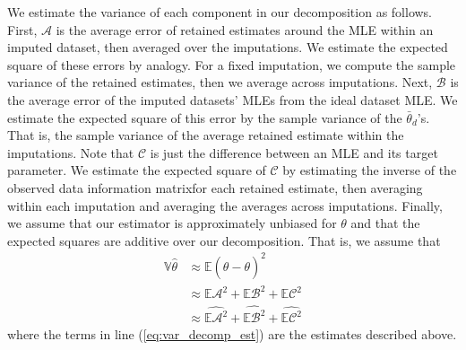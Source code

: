 \documentclass[11pt, oneside]{article}   	%
\newcommand{\bV}{\mathbb{V}}
\newcommand{\bE}{\mathbb{E}}
\begin{document}
We estimate the variance of each component in our decomposition as follows. First, $\mathcal{A}$ is the average error of retained estimates around the MLE within an imputed dataset, then averaged over the imputations. We estimate the expected square of these errors by analogy. For a fixed imputation, we compute the sample variance of the retained estimates, then we average across imputations. Next, $\mathcal{B}$ is the average error of the imputed datasets' MLEs from the ideal dataset MLE. We estimate the expected square of this error by the sample variance of the $\bar{\theta}_d$'s. That is, the sample variance of the average retained estimate within the imputations. Note that $\mathcal{C}$ is just the difference between an MLE and its target parameter. We estimate the expected square of $\mathcal{C}$ by estimating the inverse of the observed data information matrix\footnotemark for each retained estimate, then averaging within each imputation and averaging the averages across imputations. Finally, we assume that our estimator is approximately unbiased for $\theta$ and that the expected squares are additive over our decomposition. That is, we assume that
%
\begin{align}
	\bV \hat{\theta} & \approx \bE (\hat{\theta} - \theta)^2\\
	& \approx \bE \mathcal{A}^2 + \bE \mathcal{B}^2 + \bE \mathcal{C}^2\\
	& \approx \widehat{\bE \mathcal{A}^2} + \widehat{\bE \mathcal{B}^2} + \widehat{\bE \mathcal{C}^2} \label{eq:var_decomp_est}
\end{align}
%
where the terms in line (\ref{eq:var_decomp_est}) are the estimates described above.

\end{document}
